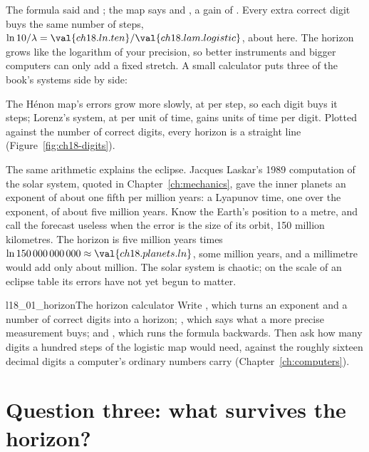 \noindent
The formula said  and ; the map says
 and , a gain of
. Every extra correct digit
buys the same number of steps, $\ln 10 / \lambda = \val{ch18.ln.ten} /
\val{ch18.lam.logistic}$, about  here. The horizon
grows like the logarithm of your precision, so better instruments and
bigger computers can only add a fixed stretch. A small calculator puts three
of the book's systems side by side:



\noindent
The Hénon map's errors grow more slowly, at  per step,
so each digit buys it
 steps; Lorenz's system, at
 per unit of time, gains 
units of time per digit. Plotted against the number of correct digits,
every horizon is a straight line (Figure~\ref{fig:ch18-digits}).

The same arithmetic explains the eclipse. Jacques Laskar's 1989 computation
of the solar system, quoted in Chapter~\ref{ch:mechanics}, gave the inner
planets an exponent of about one fifth per million years: a Lyapunov time,
one over the exponent, of about five million years. Know the Earth's
position to a metre, and call the forecast useless when the error is the
size of its orbit, 150 million kilometres. The horizon is five million
years times $\ln 150\,000\,000\,000 \approx \val{ch18.planets.ln}$, some
 million years, and a millimetre would add only about
 million. The solar system is chaotic; on the scale
of an eclipse table its errors have not yet begun to matter.

\begin{lab}{l18_01_horizon}{The horizon calculator}
Write , which turns an exponent and a number of
correct digits into a horizon; , which says what a more
precise measurement buys; and , which runs the formula
backwards. Then ask how many digits a hundred steps of the logistic map
would need, against the roughly sixteen decimal digits a computer's ordinary
numbers carry (Chapter~\ref{ch:computers}).
\end{lab}

\section{Question three: what survives the horizon?}
\label{sec:ch18-beyond}

